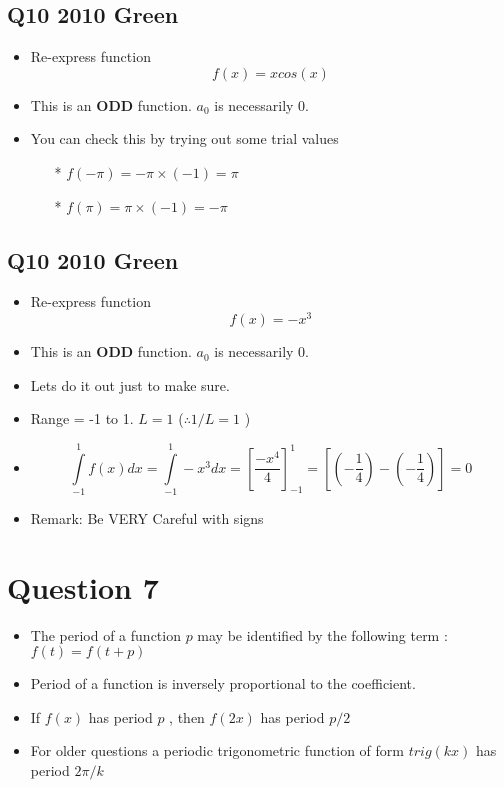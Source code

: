 \documentclass[11pt,a4paper,titlepage,oneside,openany]{article}
\numberwithin{equation}{section}
\numberwithin{algorithm}{section}
\numberwithin{figure}{section}
\numberwithin{table}{section}
\begin{document}
\subsection*{Q10 2010 Green}
\Large{
\begin{itemize}
\item Re-express function \[f(x) = xcos(x)  \]
\item This is an \textbf{ODD} function. $a_0$ is necessarily 0.
\item You can check this by trying out some trial values
\begin{itemize}
\item[*] $f(-\pi) = -\pi \times (-1) = \pi$
\item[*] $f(\pi) = \pi \times (-1) = -\pi$
\end{itemize}
\end{itemize}
}


\subsection*{Q10 2010 Green}
\Large{
\begin{itemize}
\item Re-express function \[f(x) = -x^3  \]
\item This is an \textbf{ODD} function. $a_0$ is necessarily 0.
\item Lets do it out just to make sure.
\item Range = -1 to 1. $L=1$ ($\therefore 1/L = 1$ )
\item \[\int\limits^{1}_{-1} f(x) dx =\int\limits^{1}_{-1}-x^3 dx = \left[\frac{-x^4}{4} \right]^{1}_{-1}  = \left[\left(- \frac{1}{4} \right) - \left(- \frac{1}{4} \right) \right]  = 0\]
\item Remark: Be VERY Careful with signs
\end{itemize}
}
\section*{Question 7}

\begin{itemize}
\item The period of a function $p$ may be identified by the following term : $f(t) = f(t+p)$
\item Period of a function is inversely proportional to the coefficient.
\item If $f(x)$ has period $p$ , then $f(2x)$ has period $p/2$
\item For older questions a periodic trigonometric function of form $trig(kx)$ has period $2\pi/k$
\end{itemize}
\end{document}
